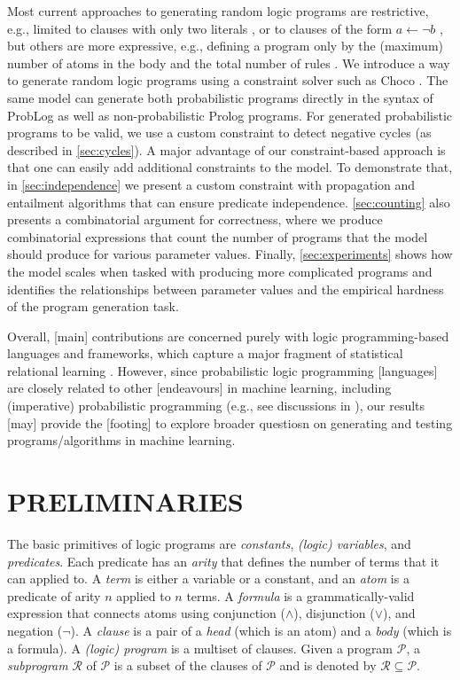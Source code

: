 \documentclass[letterpaper]{article}
\theoremstyle{definition}
\begin{document}
Most current approaches to generating random logic programs are restrictive,
e.g., limited to clauses with only two literals
\citep{DBLP:conf/lpnmr/NamasivayamT09}, or to clauses of the form $a \gets \neg
b$ \citep{DBLP:journals/tocl/WenWSL16}, but others are more expressive, e.g.,
defining a program only by the (maximum) number of atoms in the body and the
total number of rules \citep{DBLP:conf/iclp/ZhaoL03}. We introduce a way to
generate random logic programs using a constraint solver such as Choco
\citep{choco}. The same model can generate both probabilistic programs directly
in the syntax of ProbLog \citep{DBLP:conf/ijcai/RaedtKT07} as well as
non-probabilistic Prolog programs. For generated probabilistic programs to be
valid, we use a custom constraint to detect negative cycles (as described in
\cref{sec:cycles}). A major advantage of our constraint-based approach is that
one can easily add additional constraints to the model. To demonstrate that, in
\cref{sec:independence} we present a custom constraint with propagation and
entailment algorithms that can ensure predicate independence.
\cref{sec:counting} also presents a combinatorial argument for correctness,
where we produce combinatorial expressions that count the number of programs
that the model should produce for various parameter values. Finally,
\cref{sec:experiments} shows how the model scales when tasked with producing
more complicated programs and identifies the relationships between parameter
values and the empirical hardness of the program generation task.

Overall, [main] contributions are concerned purely with logic programming-based
languages and frameworks, which capture a major fragment of statistical
relational learning \citep{DBLP:series/synthesis/2016Raedt}.
However, since probabilistic logic programming [languages] are closely related
to other [endeavours] in machine learning, including (imperative) probabilistic
programming (e.g., see discussions in \citep{DBLP:journals/ml/RaedtK15}), our
results [may] provide the [footing] to explore broader questiosn on generating
and testing programs/algorithms in machine learning.

\section{PRELIMINARIES}

The basic primitives of logic programs are \emph{constants}, \emph{(logic)
  variables}, and \emph{predicates}. Each predicate has an \emph{arity} that
defines the number of terms that it can applied to. A \emph{term} is either a
variable or a constant, and an \emph{atom} is a predicate of arity $n$ applied
to $n$ terms. A \emph{formula} is a grammatically-valid expression that connects
atoms using conjunction ($\land$), disjunction ($\lor$), and negation ($\neg$).
A \emph{clause} is a pair of a \emph{head} (which is an atom) and a \emph{body}
(which is a formula). A \emph{(logic) program} is a multiset of clauses. Given a
program $\mathscr{P}$, a \emph{subprogram} $\mathscr{R}$ of $\mathscr{P}$ is a
subset of the clauses of $\mathscr{P}$ and is denoted by $\mathscr{R} \subseteq
\mathscr{P}$.
\end{document}

